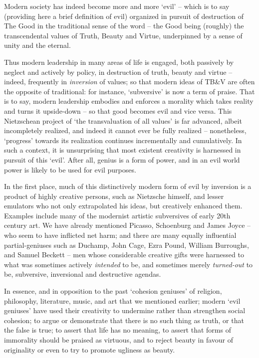 \documentclass[
]{book}
\begin{document}
Modern society has indeed become more and more `evil' -- which is to say (providing here a brief definition of evil) organized in pursuit of destruction of The Good in the traditional sense of the word -- the Good being (roughly) the transcendental values of Truth, Beauty and Virtue, underpinned by a sense of unity and the eternal.

Thus modern leadership in many areas of life is engaged, both passively by neglect and actively by policy, in destruction of truth, beauty and virtue -- indeed, frequently in \emph{inversion} of values; so that modern ideas of TB\&V are often the opposite of traditional: for instance, `subversive' is now a term of praise. That is to say, modern leadership embodies and enforces a morality which takes reality and turns it upside-down -- so that good becomes evil and vice versa. This Nietzschean project of `the transvaluation of all values' is far advanced, albeit incompletely realized, and indeed it cannot ever be fully realized -- nonetheless, `progress' towards its realization continues incrementally and cumulatively. In such a context, it is unsurprising that most existent creativity is harnessed in pursuit of this `evil'. After all, genius is a form of power, and in an evil world power is likely to be used for evil purposes.

In the first place, much of this distinctively modern form of evil by inversion is a product of highly creative persons, such as Nietzsche himself, and lesser emulators who not only extrapolated his ideas, but creatively enhanced them. Examples include many of the modernist artistic subversives of early 20th century art. We have already mentioned Picasso, Schoenburg and James Joyce -- who seem to have inflicted net harm; and there are many equally influential partial-geniuses such as Duchamp, John Cage, Ezra Pound, William Burroughs, and Samuel Beckett -- men whose considerable creative gifts were harnessed to what was sometimes actively \emph{intended} to be, and sometimes merely \emph{turned-out} to be, subversive, inversional and destructive agendas.

In essence, and in opposition to the past `cohesion geniuses' of religion, philosophy, literature, music, and art that we mentioned earlier; modern `evil geniuses' have used their creativity to undermine rather than strengthen social cohesion; to argue or demonstrate that there is no such thing as truth, or that the false is true; to assert that life has no meaning, to assert that forms of immorality should be praised as virtuous, and to reject beauty in favour of originality or even to try to promote ugliness as beauty.
\end{document}
